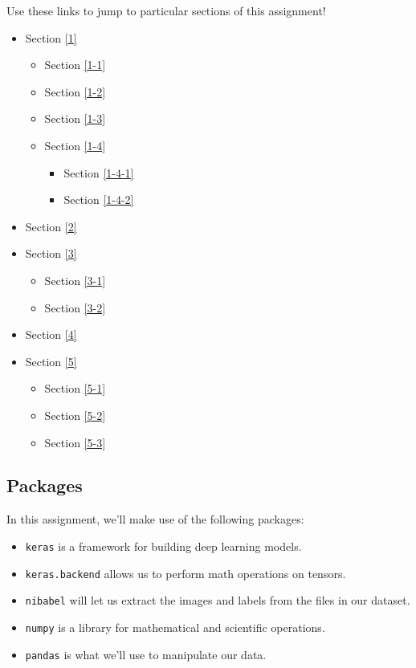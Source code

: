 \documentclass[11pt]{article}
\providecommand{\tightlist}{%
      \setlength{\itemsep}{0pt}\setlength{\parskip}{0pt}}
\begin{document}
Use these links to jump to particular sections of this assignment!

\begin{itemize}
\tightlist
\item
  Section \ref{1}

  \begin{itemize}
  \tightlist
  \item
    Section \ref{1-1}
  \item
    Section \ref{1-2}
  \item
    Section \ref{1-3}
  \item
    Section \ref{1-4}

    \begin{itemize}
    \tightlist
    \item
      Section \ref{1-4-1}
    \item
      Section \ref{1-4-2}
    \end{itemize}
  \end{itemize}
\item
  Section \ref{2}
\item
  Section \ref{3}

  \begin{itemize}
  \tightlist
  \item
    Section \ref{3-1}
  \item
    Section \ref{3-2}
  \end{itemize}
\item
  Section \ref{4}
\item
  Section \ref{5}

  \begin{itemize}
  \tightlist
  \item
    Section \ref{5-1}
  \item
    Section \ref{5-2}
  \item
    Section \ref{5-3}
  \end{itemize}
\end{itemize}

    \hypertarget{packages}{%
\subsection{Packages}\label{packages}}

In this assignment, we'll make use of the following packages:

\begin{itemize}
\tightlist
\item
  \texttt{keras} is a framework for building deep learning models.
\item
  \texttt{keras.backend} allows us to perform math operations on
  tensors.
\item
  \texttt{nibabel} will let us extract the images and labels from the
  files in our dataset.
\item
  \texttt{numpy} is a library for mathematical and scientific
  operations.
\item
  \texttt{pandas} is what we'll use to manipulate our data.
\end{itemize}
\end{document}
